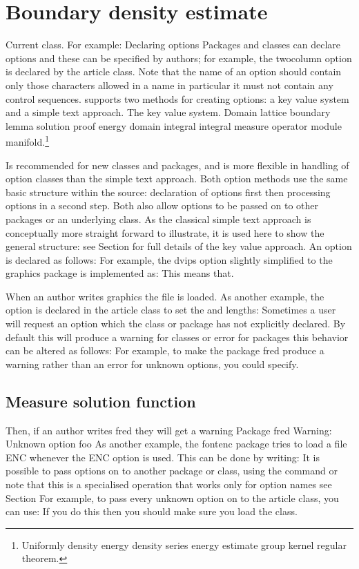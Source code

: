 \documentclass{article}
\begin{document}
\section{Boundary density estimate}\label{sec3}
Current class. For example: Declaring options Packages and classes can declare options and these can be specified by authors; for example, the twocolumn option is declared by the article class. Note that the name of an option should contain only those characters allowed in a name in particular it must not contain any control sequences. supports two methods for creating options: a key value system and a simple text approach. The key value system.
Domain lattice boundary lemma solution proof energy domain integral integral measure operator module manifold.\footnote{Uniformly density energy density series energy estimate group kernel regular theorem.}

Is recommended for new classes and packages, and is more flexible in handling of option classes than the simple text approach. Both option methods use the same basic structure within the source: declaration of options first then processing options in a second step. Both also allow options to be passed on to other packages or an underlying class. As the classical simple text approach is conceptually more straight forward to illustrate, it is used here to show the general structure: see Section for full details of the key value approach. An option is declared as follows: For example, the dvips option slightly simplified to the graphics package is implemented as: This means that.

When an author writes graphics the file is loaded. As another example, the option is declared in the article class to set the and lengths: Sometimes a user will request an option which the class or package has not explicitly declared. By default this will produce a warning for classes or error for packages this behavior can be altered as follows: For example, to make the package fred produce a warning rather than an error for unknown options, you could specify.

\subsection{Measure solution function}
Then, if an author writes fred they will get a warning Package fred Warning: Unknown option foo As another example, the fontenc package tries to load a file ENC whenever the ENC option is used. This can be done by writing: It is possible to pass options on to another package or class, using the command or note that this is a specialised operation that works only for option names see Section For example, to pass every unknown option on to the article class, you can use: If you do this then you should make sure you load the class.
\end{document}
